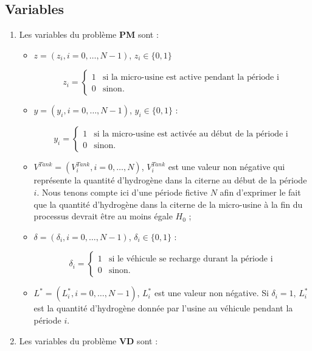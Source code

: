 \subsection{Variables}
\begin{enumerate}
	\item Les variables du problème \textbf{PM} sont :
	\begin{itemize}[label=$\square$]
		\item $z=(z_i, i=0, \dots, N-1)$, $z_i \in \{0,1\} $ 
		
		$$
		z_i= \left\{
		\begin{array}{ll}
		1 & \mbox{si la micro-usine est active pendant la période i} \\
		0 & \mbox{sinon.}
		\end{array}
		\right.
		$$
		
		\item $y=(y_i, i=0, \dots, N-1)$, $y_i \in \{0,1\} $ :
		
		$$
		y_i= \left\{
		\begin{array}{ll}
		1 & \mbox{si la micro-usine est activée au début de la période i} \\
		0 & \mbox{sinon.}
		\end{array}
		\right.
		$$
		\item $V^{Tank} = (V^{Tank}_i, i=0, \dots, N)$, $V^{Tank}_i$ est une valeur non négative qui représente la quantité d'hydrogène dans la citerne au début de la période $i$. Nous tenons compte ici d'une période fictive $N$ afin d'exprimer le fait que la quantité d'hydrogène dans la citerne de la micro-usine à la fin du processus devrait être au moins égale $H_0$ ;
		
		\item $\delta = (\delta_i, i = 0, \dots, N-1)$, $\delta_i \in \{0,1\} $ :
		
		$$
		\delta_i= \left\{
		\begin{array}{ll}
		1 & \mbox{si le véhicule se recharge durant la période i} \\
		0 & \mbox{sinon.}
		\end{array}
		\right.
		$$
		
		\item $L^*=(L^*_i, i =0, \dots, N-1)$, $L^*_i$ est une valeur non négative. Si $\delta_i=1$, $L^*_i$ est la quantité d'hydrogène donnée par l'usine au véhicule pendant la période $i$.
	\end{itemize}
	\item Les variables du problème \textbf{VD} sont :
	

\end{enumerate}
